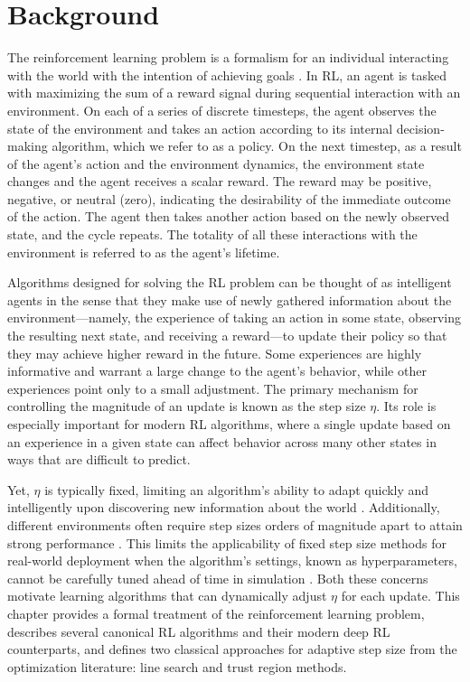 \begin{enumerate}
  \end{enumerate}
  
  \chapter{Background} \label{sec: background}
  The reinforcement learning problem is a formalism for an individual interacting with the world with the intention of achieving goals \cite{sutton1998introduction}. In RL, an agent is tasked with maximizing the sum of a reward signal during sequential interaction with an environment. On each of a series of discrete timesteps, the agent observes the state of the environment and takes an action according to its internal decision-making algorithm, which we refer to as a policy. On the next timestep, as a result of the agent's action and the environment dynamics, the environment state changes and the agent receives a scalar reward. The reward may be positive, negative, or neutral (zero), indicating the desirability of the immediate outcome of the action. The agent then takes another action based on the newly observed state, and the cycle repeats. The totality of all these interactions with the environment is referred to as the agent's lifetime. 
  
  Algorithms designed for solving the RL problem can be thought of as intelligent agents in the sense that they make use of newly gathered information about the environment—namely, the experience of taking an action in some state, observing the resulting next state, and receiving a reward—to update their policy so that they may achieve higher reward in the future. Some experiences are highly informative and warrant a large change to the agent's behavior, while other experiences point only to a small adjustment. The primary mechanism for controlling the magnitude of an update is known as the step size $\eta$. Its role is especially important for modern RL algorithms, where a single update based on an experience in a given state can affect behavior across many other states in ways that are difficult to predict. 
  
  Yet, $\eta$ is typically fixed, limiting an algorithm's ability to adapt quickly and intelligently upon discovering new information about the world . Additionally, different environments often require step sizes orders of magnitude apart to attain strong performance . This limits the applicability of fixed step size methods for real-world deployment when the algorithm's settings, known as hyperparameters, cannot be carefully tuned ahead of time in simulation . Both these concerns motivate learning algorithms that can dynamically adjust $\eta$ for each update. This chapter provides a formal treatment of the reinforcement learning problem, describes several canonical RL algorithms and their modern deep RL counterparts, and defines two classical approaches for adaptive step size from the optimization literature: line search and trust region methods.
  
